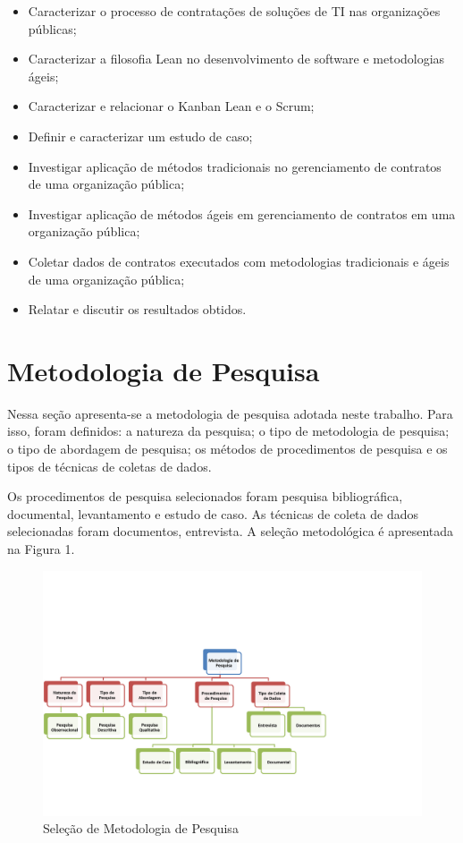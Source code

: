 \begin{itemize}
\item Caracterizar o processo de contratações de soluções de TI nas organizações públicas;
\item Caracterizar a filosofia Lean no desenvolvimento de software e metodologias ágeis;
\item Caracterizar e relacionar o Kanban Lean e o Scrum;
\item Definir e caracterizar um estudo de caso;
\item Investigar aplicação de métodos tradicionais no gerenciamento de contratos de uma organização pública;
\item Investigar aplicação de métodos ágeis em gerenciamento de contratos em uma organização pública;
\item Coletar dados de contratos executados com metodologias tradicionais e ágeis de uma organização pública;
\item Relatar e discutir os resultados obtidos.
\end{itemize}

\section[Metodologia de Pesquisa]{Metodologia de Pesquisa}

Nessa seção apresenta-se a metodologia de pesquisa adotada neste trabalho.
Para isso, foram definidos: a natureza da pesquisa; o tipo de metodologia de pesquisa; o tipo de abordagem de pesquisa; os métodos de
procedimentos de pesquisa e os tipos de técnicas de coletas de dados.

Os procedimentos de pesquisa selecionados foram pesquisa bibliográfica,
documental, levantamento e estudo de caso. As técnicas de coleta de dados selecionadas foram
documentos, entrevista. A seleção
metodológica é apresentada na Figura 1.

	\begin{figure}[h]
		\centering
		\label{fig01}
			\includegraphics[scale=0.7]{figuras/metodologiapesquisa.png}
		\caption{Seleção de Metodologia de Pesquisa}
	\end{figure}

